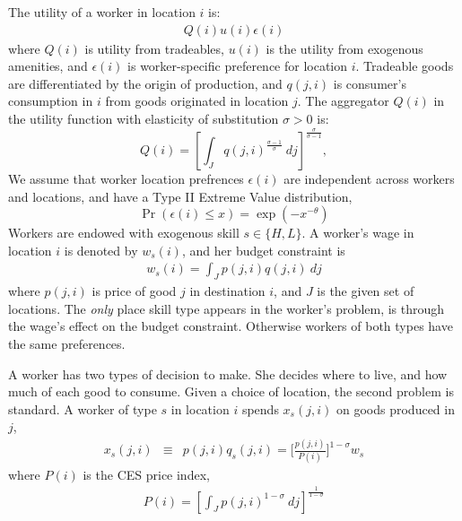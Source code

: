 \documentclass[12 pt]{article}
\begin{document}
The utility of a worker in location $i$ is:
\begin{eqnarray}\label{eq:utility}
	Q(i) u(i) \epsilon(i)
\end{eqnarray} 
where $Q(i)$ is utility from tradeables, $u(i)$ is the utility from exogenous amenities, and $\epsilon(i)$ is worker-specific preference for location $i$.  Tradeable goods are differentiated by the origin of production, and $q(j,i)$ is consumer's consumption in $i$ from goods originated in location $j$. The aggregator $Q(i)$ in the utility function with elasticity of substitution $\sigma>0$ is:
\[
	Q(i) = \left[\int_J q(j,i)^{\frac{ \sigma - 1}{\sigma}}~ dj\right]^{\frac{\sigma}{\sigma-1}},
\]
We assume that worker location prefrences $\epsilon(i)$ are independent across workers and locations, and have a Type II Extreme Value distribution,
\[
    \Pr(\epsilon(i) \leq x) = \exp(-x^{-\theta})
\]
Workers are endowed with exogenous skill $s \in \{H,L\}$. A worker's wage in location $i$ is denoted by $w_s(i)$, and her budget constraint is 
\begin{eqnarray}\label{eq:budget}
	w_s(i) = \int_J p(j,i)q(j,i)~dj 
\end{eqnarray}
where $p(j,i)$ is price of good $j$ in destination $i$, and $J$ is the given set of locations.  The \emph{only} place skill type appears in the worker's problem, is through the wage's effect on the budget constraint.  Otherwise workers of both types have the same preferences.

A worker has two types of decision to make.  She decides where to live, and how much of each good to consume.  Given a choice of location, the second problem is standard.  A worker of type $s$ in location $i$ spends $x_s(j,i)$ on goods produced in $j$,
\begin{eqnarray}\label{eq:x_s}
	x_s(j,i) & \equiv & p(j,i) q_s(j,i) = \Big[ \frac{p(j,i)}{P(i)} \Big]^{1-\sigma} w_s
\end{eqnarray}
where $P(i)$ is the CES price index,
\begin{eqnarray}\label{eq:price_index}
	P(i) = \left[\int_J p(j,i)^{1-\sigma}~ dj\right]^{\frac{1}{1-\sigma}}
\end{eqnarray}
\end{document}
